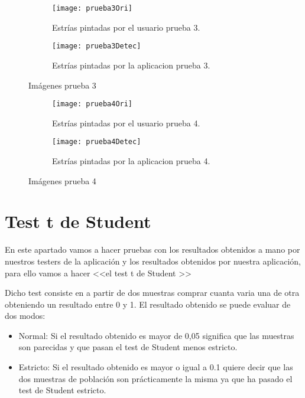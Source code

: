 \begin{figure}
	\begin{subfigure}[c]{.5\linewidth}
	\centering\large \texttt{[image: prueba3Ori]}
	\caption{Estrías pintadas por el usuario prueba 3.}\label{fig:orip3}
	\end{subfigure}%
	\begin{subfigure}[c]{.5\linewidth}
	\centering\large \texttt{[image: prueba3Detec]}
	\caption{Estrías pintadas por la aplicacion prueba 3.}\label{fig:calcp3}
	\end{subfigure}%
	\caption{Imágenes prueba 3}
	\label{fig:p3}

\end{figure}



\begin{figure}
	\begin{subfigure}[c]{.5\linewidth}
	\centering\large \texttt{[image: prueba4Ori]}
	\caption{Estrías pintadas por el usuario prueba 4.}\label{fig:orip4} 
	\end{subfigure}%
	\begin{subfigure}[c]{.5\linewidth}
	\centering\large \texttt{[image: prueba4Detec]}
	\caption{Estrías pintadas por la aplicacion prueba 4.}\label{fig:calcp4}
	\end{subfigure}%
	\caption{Imágenes prueba 4}
	\label{fig:p4}

\end{figure}

\section{Test t de Student}
En este apartado vamos a hacer pruebas con los resultados obtenidos a mano por nuestros testers de la aplicación y los resultados obtenidos por nuestra aplicación, para ello vamos a hacer <<el test t de Student \cite{wiki:testStude}>>

Dicho test consiste en a partir de dos muestras comprar cuanta varia una de otra obteniendo un resultado entre 0 y 1. El resultado obtenido se puede evaluar de dos modos:
\begin{itemize}
\item Normal: Si el resultado obtenido es mayor de 0,05 significa que las muestras son parecidas y que pasan el test de Student menos estricto.
\item Estricto: Si el resultado obtenido es mayor o igual a 0.1 quiere decir que las dos muestras de población son prácticamente la misma ya que ha pasado el test de Student estricto.
\end{itemize} 

